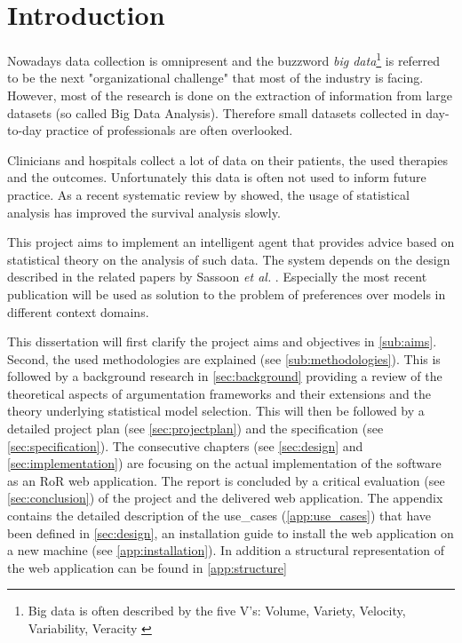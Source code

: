 \section{Introduction}


Nowadays data collection is omnipresent and the buzzword \textit{big data}\footnote{Big data is often described by the five V's: Volume, Variety, Velocity, Variability, Veracity \cite{Hilbert2015}} is referred to be the next "organizational challenge" that most of the industry is facing\cite{bigdata}. However, most of the research is done on the extraction of information from large datasets (so called Big Data Analysis). Therefore small datasets collected in day-to-day practice of professionals are often overlooked. 

Clinicians and hospitals collect a lot of data on their patients, the used therapies and the outcomes. Unfortunately this data is often not used to inform future practice. As a recent systematic review by \cite{survivalAnalysis} showed, the usage of statistical analysis has improved the survival analysis slowly. 

This project aims to implement an intelligent agent that provides advice based on statistical theory on the analysis of such data. The system depends on the design described in the related papers by Sassoon \textit{et al.} \cite{sassoon2014,sassoon2016,sassoon2016CD}. Especially the most recent publication will be used as solution to the problem of preferences over models in different context domains. 


This dissertation will first clarify the project aims and objectives in \autoref{sub:aims}. Second, the used methodologies are explained (see \autoref{sub:methodologies}). This is followed by a background research in \autoref{sec:background} providing a review of the theoretical aspects of argumentation frameworks and their extensions and the theory underlying statistical model selection. 
This will then be followed by a detailed project plan (see \autoref{sec:projectplan}) and the specification (see \autoref{sec:specification}). The consecutive chapters (see \autoref{sec:design} and \ref{sec:implementation}) are focusing on the actual implementation of the software as an \gls{RoR} web application. 
The report is concluded by a critical evaluation (see \autoref{sec:conclusion}) of the project and the delivered web application. 
The appendix contains the detailed description of the \glspl{use_case} (\autoref{app:use_cases}) that have been defined in \autoref{sec:design}, an installation guide to install the web application on a new machine (see \autoref{app:installation}). In addition a structural representation of the web application can be found in \autoref{app:structure}

